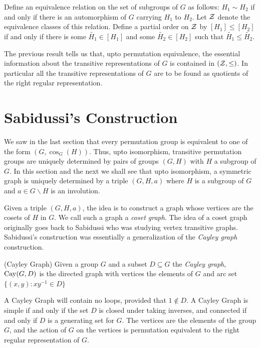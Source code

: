 Define an equivalence relation on the set of subgroups of $G$
as follows: $H_1 \sim H_2$ if and only if there is an automorphism of $G$
carrying $H_1$ to $H_2$. 
Let $\mathcal{Z}$ denote the equivalence classes of this relation.
Define a partial order on $\mathcal{Z}$
by $[H_1] \leq [H_2]$ if and only if there is some $\tilde{H_1} \in [H_1]$ and some
$\tilde{H_2} \in [H_2]$ such that $\tilde{H_1} \leq \tilde{H_2}$. 

The previous result tells us that, upto permutation equivalence,
the essential information about the transitive representations of $G$ 
is contained in $(\mathcal{Z}, \leq)$. In particular all the transitive representations
of $G$ are to be found as quotients of the right regular representation.

\section{Sabidussi's Construction}


We saw in the last section that
every permutation group is equivalent to
one of the form $(G,\cos_G(H))$.
Thus, upto isomorphism, transitive permutation groups are 
uniquely determined by pairs of groups $(G,H)$ 
with $H$ a subgroup of $G$.
In this section and the next
we shall see that upto isomorphism,
a symmetric graph is uniquely
determined by a triple $(G,H,a)$ 
where $H$ is a subgroup of $G$ 
and $a \in G \backslash H$ is an involution.

Given a triple $(G,H,a)$, the idea is to construct
a graph whose vertices are the cosets of $H$ in $G$.
We call such a graph a {\it coset graph}.
The idea of a coset graph originally goes back to Sabidussi
who was studying vertex transitive graphs.
Sabidussi's construction was essentially 
a generalization of the {\it Cayley graph} construction.

\begin{definition} (Cayley Graph)
Given a group $G$ and a subset $D \subseteq G$ the {\it Cayley graph},
$\operatorname{Cay}(G,D)$ is the directed graph with vertices the elements of $G$
and arc set $\{(x,y) : xy^{-1} \in D \}$
\end{definition}

A Cayley Graph will contain no loops,
provided that $1 \not\in D$.
A Cayley Graph is simple if and only if 
the set $D$ is closed under taking inverses,
and connected if and only if $D$ is a generating set for $G$.
The vertices are the elements of the group $G$,
and the action of $G$ on the vertices is permutation equivalent 
to the right regular representation of $G$.

